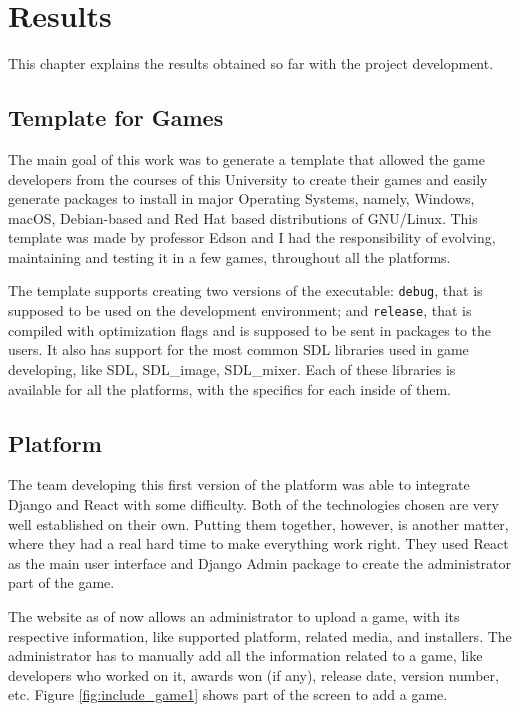 \chapter[Results]{Results}
\label{sec:results}

This chapter explains the results obtained so far with the project development.


\section{Template for Games}
\label{sec:template_for_games}

The main goal of this work was to generate a template that allowed the game developers from the courses of this University to create their games and easily generate packages to install in major Operating Systems, namely, Windows, macOS, Debian-based and Red Hat based distributions of GNU/Linux. This template was made by professor Edson and I had the responsibility of evolving, maintaining and testing it in a few games, throughout all the platforms.

The template supports creating two versions of the executable: \texttt{debug}, that is supposed to be used on the development environment; and \texttt{release}, that is compiled with optimization flags and is supposed to be sent in packages to the users. It also has support for the most common SDL libraries used in game developing, like SDL, SDL\_image, SDL\_mixer. Each of these libraries is available for all the platforms, with the specifics for each inside of them.


\section{Platform}
\label {sec:platform}

The team developing this first version of the platform was able to integrate Django and React with some difficulty. Both of the technologies chosen are very well established on their own. Putting them together, however, is another matter, where they had a real hard time to make everything work right. They used React as the main user interface and Django Admin package to create the administrator part of the game.

The website as of now allows an administrator to upload a game, with its respective information, like supported platform, related media, and installers.
The administrator has to manually add all the information related to a game, like developers who worked on it, awards won (if any), release date, version number, etc. Figure \ref{fig:include_game1} shows part of the screen to add a game.

